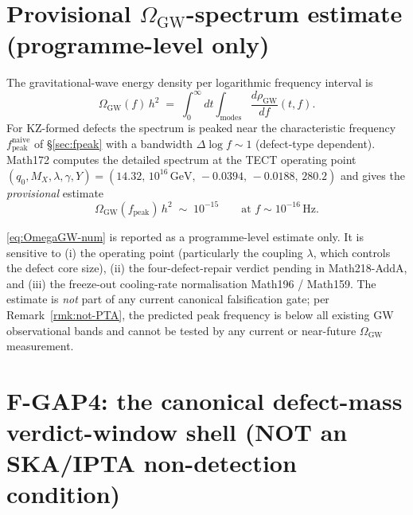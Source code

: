 \section{Provisional $\Omega_{\mathrm{GW}}$-spectrum estimate
(programme-level only)}\label{sec:OmegaGW}

The gravitational-wave energy density per logarithmic frequency
interval is
\begin{equation}\label{eq:OmegaGW-def}
  \Omega_{\mathrm{GW}}(f)\,h^{2}
  \;=\;
  \int_{0}^{\infty} dt \int_{\text{modes}}
  \frac{d\rho_{\mathrm{GW}}}{df}(t,f).
\end{equation}
For KZ-formed defects the spectrum is peaked near the characteristic
frequency $f_{\mathrm{peak}}^{\mathrm{naive}}$ of \S\ref{sec:fpeak}
with a bandwidth $\Delta\log f \sim 1$ (defect-type dependent).
Math172 \cite{Math172} computes the detailed spectrum at the TECT
operating point
$(q_0, M_X, \lambda, \gamma, Y) = (14.32,\, 10^{16}\,\mathrm{GeV},\,
-0.0394,\, -0.0188,\, 280.2)$ and gives the \emph{provisional}
estimate
\begin{equation}\label{eq:OmegaGW-num}
  \Omega_{\mathrm{GW}}(f_{\mathrm{peak}})\,h^{2}
  \;\sim\; 10^{-15}
  \qquad
  \text{at } f \sim 10^{-16}\,\mathrm{Hz}.
\end{equation}

\begin{remark}\label{rmk:provisional-OmegaGW}
\eqref{eq:OmegaGW-num} is reported as a programme-level estimate
only. It is sensitive to (i) the operating point (particularly the
coupling $\lambda$, which controls the defect core size),
(ii) the four-defect-repair verdict pending in Math218-AddA, and
(iii) the freeze-out cooling-rate normalisation Math196 / Math159.
The estimate is \emph{not} part of any current canonical
falsification gate; per Remark~\ref{rmk:not-PTA}, the predicted
peak frequency is below all existing GW observational bands and
cannot be tested by any current or near-future
$\Omega_{\mathrm{GW}}$ measurement.
\end{remark}

\section{F-GAP4: the canonical defect-mass verdict-window shell
(NOT an SKA/IPTA non-detection condition)}\label{sec:FGAP4}

